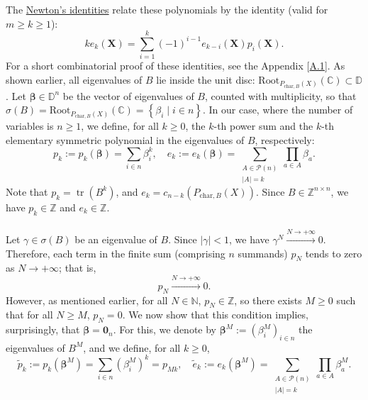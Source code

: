 \documentclass[11pt, a4paper, oneside]{article}
\theoremstyle{remark}
\theoremstyle{lemma}
\begin{document}
The \href{https://en.wikipedia.org/wiki/Newton%27s_identities}{Newton’s identities} relate these polynomials by the identity (valid for \( m \geq k \geq 1 \)):
\[
k e_k\left(\mathbf{X}\right) = \sum_{i=1}^k (-1)^{i-1} e_{k-i}\left(\mathbf{X}\right) p_i\left(\mathbf{X}\right).
\]
For a short combinatorial proof of these identities, see the Appendix [\hyperref[A1]{A.1}].
As shown earlier, all eigenvalues of \( B \) lie inside the unit disc: \( \mathrm{Root}_{P_{\text{char},B}(X)}\left(\mathbb{C}\right) \subset \mathbb{D} \). Let \( \boldsymbol{\beta} \in \mathbb{D}^n \) be the vector of eigenvalues of \( B \), counted with multiplicity, so that \( \sigma(B) = \mathrm{Root}_{P_{\text{char},B}(X)}\left(\mathbb{C}\right) = \left\{ \beta_i \mid i \in n \right\} \). In our case, where the number of variables is \( n \geq 1 \), we define, for all \( k \geq 0 \), the \( k \)-th power sum and the \( k \)-th elementary symmetric polynomial in the eigenvalues of \( B \), respectively:
\[
p_k := p_k\left(\boldsymbol{\beta}\right) = \sum_{i \in n} \beta_i^k,\quad e_k := e_k\left(\boldsymbol{\beta}\right) = \sum_{\substack{A \in \mathscr{P}(n)\\\left|A\right| = k}} \prod_{a \in A} \beta_a.
\]
Note that \( p_k = \operatorname{tr}\left(B^k\right) \), and \( e_k = c_{n-k}\left(P_{\text{char},B}(X)\right) \). Since \( B \in \mathbb{Z}^{n \times n} \), we have \( p_k \in \mathbb{Z} \) and \( e_k \in \mathbb{Z} \).
\\\\
Let \( \gamma \in \sigma(B) \) be an eigenvalue of \( B \). Since \( \left|\gamma\right| < 1 \), we have \( \gamma^N \overset{N \to +\infty}{\longrightarrow} 0 \). Therefore, each term in the finite sum (comprising \( n \) summands) \( p_N \) tends to zero as \( N \to +\infty \); that is,
\[
p_N \overset{N \to +\infty}{\longrightarrow} 0.
\]
However, as mentioned earlier, for all \( N \in \mathbb{N} \), \( p_N \in \mathbb{Z} \), so there exists \( M \geq 0 \) such that for all \( N \geq M \), \( p_N = 0 \). We now show that this condition implies, surprisingly, that \( \boldsymbol{\beta} = \mathbf{0}_n \). For this, we denote by \( \boldsymbol{\beta}^M := \left( \beta_i^M \right)_{i \in n} \) the eigenvalues of \( B^M \), and we define, for all \( k \geq 0 \),
\[
\tilde{p}_k := p_k\left( \boldsymbol{\beta}^M \right) = \sum_{i \in n} \left( \beta_i^M \right)^k = p_{Mk}, \quad \tilde{e}_k := e_k\left( \boldsymbol{\beta}^M \right) = \sum_{\substack{A \in \mathscr{P}\left( n \right)\\\left|A\right| = k}} \prod_{a \in A} \beta_a^M.
\]
\end{document}
